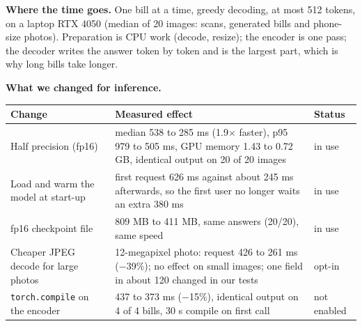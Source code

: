 \small
\textbf{Where the time goes.} One bill at a time, greedy decoding, at most 512 tokens, on a laptop RTX 4050 (median of 20 images: scans, generated bills and phone-size photos). Preparation is CPU work (decode, resize); the encoder is one pass; the decoder writes the answer token by token and is the largest part, which is why long bills take longer.

\begin{figure}[!ht]
\centering
{}
\end{figure}

\textbf{What we changed for inference.}
\begin{table}[!ht]
\centering\footnotesize
\begin{tabular}{@{}p{4.6cm}p{9.2cm}l@{}}
\toprule
Change & Measured effect & Status\\
\midrule
Half precision (fp16) & median 538 to 285 ms (1.9$\times$ faster), p95 979 to 505 ms, GPU memory 1.43 to 0.72 GB, identical output on 20 of 20 images & in use\\
Load and warm the model at start-up & first request 626 ms against about 245 ms afterwards, so the first user no longer waits an extra 380 ms & in use\\
fp16 checkpoint file & 809 MB to 411 MB, same answers (20/20), same speed & in use\\
Cheaper JPEG decode for large photos & 12-megapixel photo: request 426 to 261 ms ($-$39\%); no effect on small images; one field in about 120 changed in our tests & opt-in\\
\texttt{torch.compile} on the encoder & 437 to 373 ms ($-$15\%), identical output on 4 of 4 bills, 30 s compile on first call & not enabled\\
\bottomrule
\end{tabular}
\end{table}

